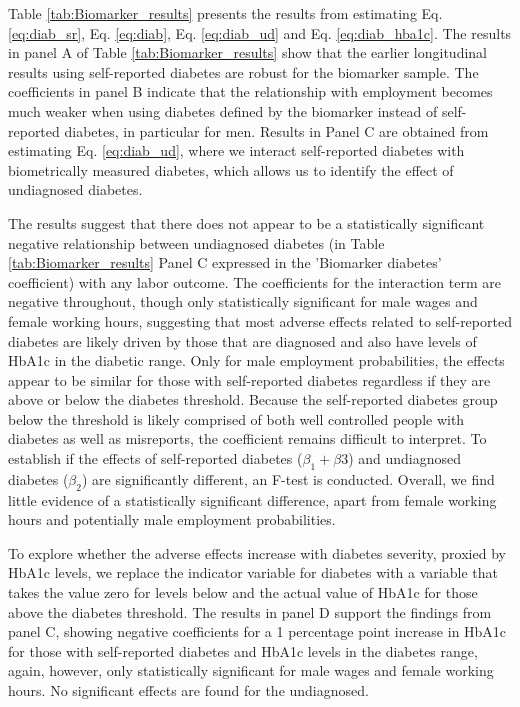 \documentclass[12pt,english]{article}
\begin{document}
Table \ref{tab:Biomarker_results} presents the results from estimating Eq. \ref{eq:diab_sr}, Eq. \ref{eq:diab}, Eq. \ref{eq:diab_ud} and Eq. \ref{eq:diab_hba1c}. The results in panel A of Table \ref{tab:Biomarker_results} show that the earlier longitudinal results using self-reported diabetes are robust for the biomarker sample. The coefficients in panel B indicate that the relationship with employment becomes much weaker when using diabetes defined by the biomarker instead of self-reported diabetes, in particular for men. Results in Panel C are obtained from estimating Eq. \ref{eq:diab_ud}, where we interact self-reported diabetes with biometrically measured diabetes, which allows us to identify the effect of undiagnosed diabetes. 

The results suggest that there does not appear to be a statistically significant negative relationship between undiagnosed diabetes (in Table \ref{tab:Biomarker_results} Panel C expressed in the 'Biomarker diabetes' coefficient) with any labor outcome. The coefficients for the interaction term are negative throughout, though only statistically significant for male wages and female working hours, suggesting that most adverse effects related to self-reported diabetes are
likely driven by those that are diagnosed and also have levels of HbA1c in the diabetic
range. Only for male employment probabilities, the effects appear to be similar for those
with self-reported diabetes regardless if they are above or below the diabetes threshold.
Because the self-reported diabetes group below the threshold is likely comprised of both
well controlled people with diabetes as well as misreports, the coefficient remains difficult
to interpret. To establish if the effects of self-reported diabetes ($\beta_{1} + \beta{3}$) and undiagnosed
diabetes ($\beta_{2}$) are significantly different, an F-test is conducted. Overall, we find little
evidence of a statistically significant difference, apart from female working hours and
potentially male employment probabilities.

To explore whether the adverse effects increase with diabetes severity, proxied by
HbA1c levels, we replace the indicator variable for diabetes with a variable that takes
the value zero for levels below and the actual value of HbA1c for those above the diabetes
threshold. The results in panel D support the findings from panel C, showing negative
coefficients for a 1 percentage point increase in HbA1c for those with self-reported diabetes
and HbA1c levels in the diabetes range, again, however, only statistically significant for
male wages and female working hours. No significant effects are found for the undiagnosed.
\end{document}
